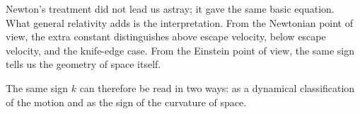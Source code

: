 Newton's treatment did not lead us astray; it gave the same basic equation. What general relativity adds is the interpretation. From the Newtonian point of view, the extra constant distinguishes above escape velocity, below escape velocity, and the knife-edge case. From the Einstein point of view, the same sign tells us the geometry of space itself.

\begin{classroomqa}
\end{classroomqa}

The same sign \(k\) can therefore be read in two ways: as a dynamical classification of the motion and as the sign of the curvature of space.
